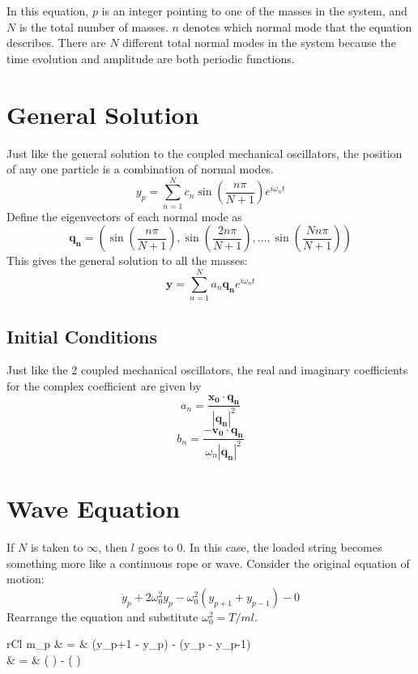\documentclass[11pt]{article}
\begin{document}
	In this equation, $p$ is an integer pointing to one of the masses in the system, and $N$ is the total number of masses. $n$ denotes which normal mode that the equation describes. There are $N$ different total normal modes in the system because the time evolution and amplitude are both periodic functions.
	
\section{General Solution}
	Just like the general solution to the coupled mechanical oscillators, the position of any one particle is a combination of normal modes.
	\begin{equation}
		y_p = \sum_{n=1}^N c_n \sin\left(\frac{n\pi}{N+1}\right) e^{i\omega_n t}
	\end{equation}
	Define the eigenvectors of each normal mode as
	\begin{equation}
		\mathbf{q_n} = \left( \sin \left(\frac{n\pi}{N+1}\right), \sin \left(\frac{2n\pi}{N+1}\right), \ldots , \sin \left(\frac{Nn\pi}{N+1}\right) \right)
	\end{equation}
	This gives the general solution to all the masses:
	\begin{equation}
		\mathbf{y} = \sum_{n=1}^N a_n \mathbf{q_n} e^{i\omega_n t}
	\end{equation}
	
	\subsection{Initial Conditions}
		Just like the 2 coupled mechanical oscillators, the real and imaginary coefficients for the complex coefficient are given by 
		\begin{equation}
			a_n = \frac{\mathbf{x_0} \cdot \mathbf{q_n}}{|\mathbf{q_n}|^2}
		\end{equation}
		\begin{equation}
			b_n = \frac{-\mathbf{v_0} \cdot \mathbf{q_n}}{\omega_n |\mathbf{q_n}|^2}
		\end{equation}
		
\section{Wave Equation}
	If $N$ is taken to $\infty$, then $l$ goes to 0. In this case, the loaded string becomes something more like a continuous rope or wave. Consider the original equation of motion:
	\begin{equation}
		\ddot{y}_p + 2\omega_0^2 y_p - \omega_0^2(y_{p+1} + y_{p-1}) - 0
	\end{equation}
	Rearrange the equation and substitute $\omega_0^2 = T/ml$.
	\begin{IEEEeqnarray}{rCl}
		m_p & = & (y_{p+1} - y_p) - (y_p - y_{p-1})\\
		 & = &  \left(  \right) - \left(  \right)
	\end{IEEEeqnarray}
	
\end{document}
